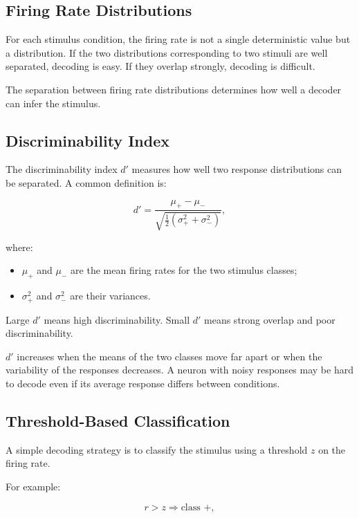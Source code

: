 \subsection{Firing Rate Distributions}

For each stimulus condition, the firing rate is not a single deterministic value but a distribution. If the two distributions corresponding to two stimuli are well separated, decoding is easy. If they overlap strongly, decoding is difficult.

The separation between firing rate distributions determines how well a decoder can infer the stimulus.

\subsection{Discriminability Index}

The discriminability index $d'$ measures how well two response distributions can be separated. A common definition is:

\[
d'
=
\frac{\mu_+ - \mu_-}
{\sqrt{\frac{1}{2}(\sigma_+^2 + \sigma_-^2)}},
\]

where:

\begin{itemize}[noitemsep]
    \item $\mu_+$ and $\mu_-$ are the mean firing rates for the two stimulus classes;
    \item $\sigma_+^2$ and $\sigma_-^2$ are their variances.
\end{itemize}

Large $d'$ means high discriminability. Small $d'$ means strong overlap and poor discriminability.

\begin{authornote}
$d'$ increases when the means of the two classes move far apart or when the variability of the responses decreases. A neuron with noisy responses may be hard to decode even if its average response differs between conditions.
\end{authornote}

\subsection{Threshold-Based Classification}

A simple decoding strategy is to classify the stimulus using a threshold $z$ on the firing rate.

For example:

\[
r > z \Rightarrow \text{class } +,
\]


